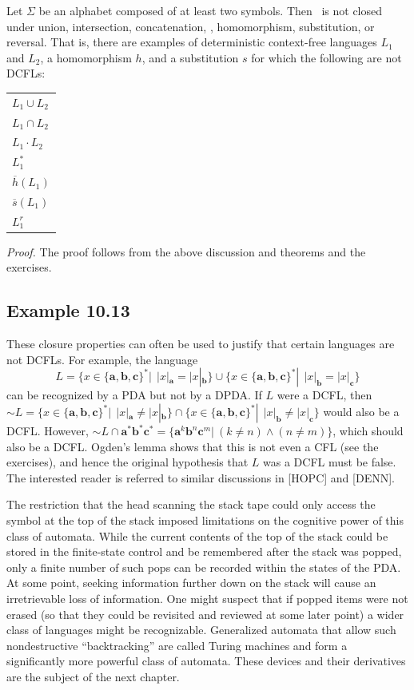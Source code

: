\begin{lmm}\label{lmm-10.1}
Let $\Sigma$ be an alphabet composed of at least two symbols. Then \ASIG\ is
not closed under union, intersection, concatenation, ,
homomorphism, substitution, or reversal. That is, there are examples of
deterministic context-free languages $L_1$ and $L_2$, a homomorphism $h$, and a
substitution $s$ for which the following are not DCFLs:
\begin{center}\begin{tabular}{l}
$L_1 \cup L_2$ \\
$L_1 \cap L_2$ \\
$L_1 \cdot L_2$ \\
$L^*_1$ \\
$\overline{h}(L_1)$ \\
$\overline{s}(L_1)$ \\
$L^r_1$
\end{tabular}\end{center}

\emph{Proof.} The proof follows from the above discussion and theorems and the
exercises.
\end{lmm}

\subsection*{Example 10.13}

These closure properties can often be used to justify that certain languages are
not DCFLs. For example, the language
\[ L = \{x\in\{\pmb{a},\pmb{b},\pmb{c}\}^*|\ \ |x|_{\pmb{a}} = |x|_{\pmb{b}}\}\cup
	\{x\in\{\pmb{a},\pmb{b},\pmb{c}\}^*|\ \ |x|_{\pmb{b}} = |x|_{\pmb{c}}\} \]
can be recognized by a PDA but not by a DPDA. If $L$ were a DCFL, then
$\sim  L = \{x\in\{\pmb{a},\pmb{b},\pmb{c}\}^*|\ \ |x|_{\pmb{a}} \not= |x|_{
\pmb{b}}\}\cap\{x\in\{\pmb{a},\pmb{b},\pmb{c}\}^*|\ \ |x|_{\pmb{b}} \not= |x|_{
\pmb{c}}\}$ would also be a DCFL. However, $\sim  L\cap\pmb{a}^*\pmb{b}^*
\pmb{c}^* = \{\pmb{a}^k\pmb{b}^n\pmb{c}^m|\ (k \not= n)\wedge(n \not= m)\}$, which
should also be a DCFL. Ogden's lemma shows that this is not even a CFL (see the
exercises), and hence the original hypothesis that $L$ was a DCFL must be false.
The interested reader is referred to similar discussions in [HOPC] and [DENN].

The restriction that the head scanning the stack tape could only access the
symbol at the top of the stack imposed limitations on the cognitive power of
this class of automata. While the current contents of the top of the stack could
be stored in the finite-state control and be remembered after the stack was
popped, only a finite number of such pops can be recorded within the states of
the PDA. At some point, seeking information further down on the stack will cause
an irretrievable loss of information. One might suspect that if popped items
were not erased (so that they could be revisited and reviewed at some later
point) a wider class of languages might be recognizable. Generalized automata
that allow such nondestructive ``backtracking'' are called Turing machines and
form a significantly more powerful class of automata. These devices and their
derivatives are the subject of the next chapter.

